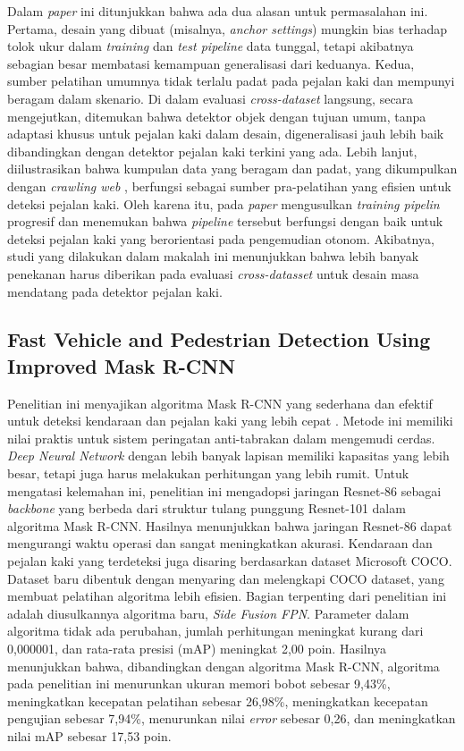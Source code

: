 Dalam \textit{paper} ini ditunjukkan bahwa ada dua alasan untuk permasalahan ini. Pertama, desain yang dibuat (misalnya, \textit{anchor settings}) mungkin bias terhadap tolok ukur dalam \textit{training} dan \textit{test pipeline} data tunggal, tetapi akibatnya sebagian besar membatasi kemampuan generalisasi dari keduanya. Kedua, sumber pelatihan umumnya tidak terlalu padat pada pejalan kaki dan mempunyi beragam dalam skenario. Di dalam evaluasi \textit{cross-dataset} langsung, secara mengejutkan, ditemukan bahwa detektor objek dengan tujuan umum, tanpa adaptasi khusus untuk pejalan kaki dalam desain, digeneralisasi jauh lebih baik dibandingkan dengan detektor pejalan kaki terkini yang ada. Lebih lanjut, diilustrasikan bahwa kumpulan data yang beragam dan padat, yang dikumpulkan dengan \textit{crawling web} , berfungsi sebagai sumber pra-pelatihan yang efisien untuk deteksi pejalan kaki. Oleh karena itu, pada \textit{paper} mengusulkan \textit{training pipelin} progresif dan menemukan bahwa \textit{pipeline} tersebut berfungsi dengan baik untuk deteksi pejalan kaki yang berorientasi pada pengemudian otonom. Akibatnya, studi yang dilakukan dalam makalah ini menunjukkan bahwa lebih banyak penekanan harus diberikan pada evaluasi \textit{cross-datasset} untuk desain masa mendatang pada detektor pejalan kaki.

\subsection{Fast Vehicle and Pedestrian Detection Using Improved Mask R-CNN}
\label{fast-vehicle}

Penelitian ini menyajikan algoritma Mask R-CNN yang sederhana dan efektif untuk deteksi kendaraan dan pejalan kaki yang lebih cepat \citep{fast-vehicle}. Metode ini memiliki nilai praktis untuk sistem peringatan anti-tabrakan dalam mengemudi cerdas. \textit{Deep Neural Network} dengan lebih banyak lapisan memiliki kapasitas yang lebih besar, tetapi juga harus melakukan perhitungan yang lebih rumit. Untuk mengatasi kelemahan ini, penelitian ini mengadopsi jaringan Resnet-86 sebagai \textit{backbone} yang berbeda dari struktur tulang punggung Resnet-101 dalam algoritma Mask R-CNN. Hasilnya menunjukkan bahwa jaringan Resnet-86 dapat mengurangi waktu operasi dan sangat meningkatkan akurasi. Kendaraan dan pejalan kaki yang terdeteksi juga disaring berdasarkan dataset Microsoft COCO. Dataset baru dibentuk dengan menyaring dan melengkapi COCO dataset, yang membuat pelatihan algoritma lebih efisien. Bagian terpenting dari penelitian ini adalah diusulkannya algoritma baru, \textit{Side Fusion FPN}. Parameter dalam algoritma tidak ada perubahan, jumlah perhitungan meningkat kurang dari 0,000001, dan rata-rata presisi (mAP) meningkat 2,00 poin. Hasilnya menunjukkan bahwa, dibandingkan dengan algoritma Mask R-CNN, algoritma pada penelitian ini menurunkan ukuran memori bobot sebesar 9,43\%, meningkatkan kecepatan pelatihan sebesar 26,98\%, meningkatkan kecepatan pengujian sebesar 7,94\%, menurunkan nilai \textit{error} sebesar 0,26, dan meningkatkan nilai mAP sebesar 17,53 poin.

